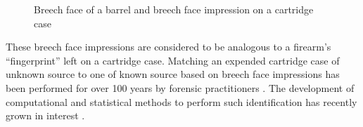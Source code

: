 \begin{Schunk}
\begin{figure}[htbp]

{\centering {}

}

\caption[Breech face of a barrel and breech face impression on a cartridge case \citep{doyle}]{Breech face of a barrel and breech face impression on a cartridge case \citep{doyle}}\label{fig:impressionBF}
\end{figure}
\end{Schunk}

These breech face impressions are considered to be analogous to a
firearm's ``fingerprint'' left on a cartridge case. Matching an expended
cartridge case of unknown source to one of known source based on breech
face impressions has been performed for over 100 years by forensic
practitioners \citep{firearm_id_thompson}. The development of
computational and statistical methods to perform such identification has
recently grown in interest \citep{council_strengthening_2009}.

